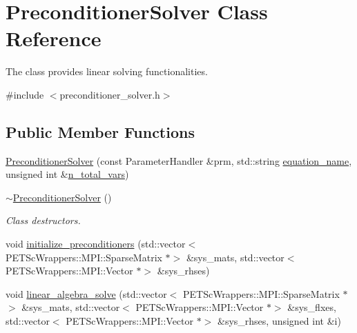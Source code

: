 \hypertarget{class_preconditioner_solver}{}\section{Preconditioner\+Solver Class Reference}
\label{class_preconditioner_solver}


The class provides linear solving functionalities.  




{\ttfamily \#include $<$preconditioner\+\_\+solver.\+h$>$}

\subsection*{Public Member Functions}
\begin{DoxyCompactItemize}
\item 
\hyperlink{class_preconditioner_solver_a5b49c94b10dc0e2b78ad278d19a8281d}{Preconditioner\+Solver} (const Parameter\+Handler \&prm, std\+::string \hyperlink{class_preconditioner_solver_af20758bf54111e7092c49688622b1e54}{equation\+\_\+name}, unsigned int \&\hyperlink{class_preconditioner_solver_ac2c59527a78b06037f0eb18132d8be63}{n\+\_\+total\+\_\+vars})
\item 
\hyperlink{class_preconditioner_solver_a8418873c20ded98dc1af3f66880d8e91}{$\sim$\+Preconditioner\+Solver} ()
\begin{DoxyCompactList}\small\item\em Class destructors. \end{DoxyCompactList}\item 
void \hyperlink{class_preconditioner_solver_adfb504161a00566d8adc3534d58b3611}{initialize\+\_\+preconditioners} (std\+::vector$<$ P\+E\+T\+Sc\+Wrappers\+::\+M\+P\+I\+::\+Sparse\+Matrix $\ast$$>$ \&sys\+\_\+mats, std\+::vector$<$ P\+E\+T\+Sc\+Wrappers\+::\+M\+P\+I\+::\+Vector $\ast$$>$ \&sys\+\_\+rhses)
\item 
void \hyperlink{class_preconditioner_solver_a5adc9e36ec12ed148eef7f1120c1bc4e}{linear\+\_\+algebra\+\_\+solve} (std\+::vector$<$ P\+E\+T\+Sc\+Wrappers\+::\+M\+P\+I\+::\+Sparse\+Matrix $\ast$$>$ \&sys\+\_\+mats, std\+::vector$<$ P\+E\+T\+Sc\+Wrappers\+::\+M\+P\+I\+::\+Vector $\ast$$>$ \&sys\+\_\+flxes, std\+::vector$<$ P\+E\+T\+Sc\+Wrappers\+::\+M\+P\+I\+::\+Vector $\ast$$>$ \&sys\+\_\+rhses, unsigned int \&i)
\end{DoxyCompactItemize}
